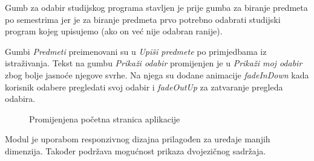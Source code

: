 \documentclass[times, utf8, zavrsni, numeric]{fer}
\begin{document}
        Gumb za odabir studijskog programa stavljen je prije gumba za biranje predmeta po semestrima jer je za biranje predmeta prvo potrebno odabrati studijski program kojeg upisujemo (ako on već nije odabran ranije).
        
        Gumbi \textit{Predmeti} preimenovani su u \textit{Upiši predmete} po primjedbama iz istraživanja. Tekst na gumbu \textit{Prikaži odabir} promijenjen je u \textit{Prikaži moj odabir} zbog bolje jasnoće njegove svrhe. Na njega su dodane animacije \textit{fadeInDown} kada korisnik odabere pregledati svoj odabir i \textit{fadeOutUp} za zatvaranje pregleda odabira.
        
        \begin{figure} [H]
          \centering
          \caption{Promijenjena početna stranica aplikacije}
        \end{figure}
        
        Modul je uporabom responzivnog dizajna prilagođen za uređaje manjih dimenzija. Također podržava mogućnost prikaza dvojezičnog sadržaja.
        
\end{document}
